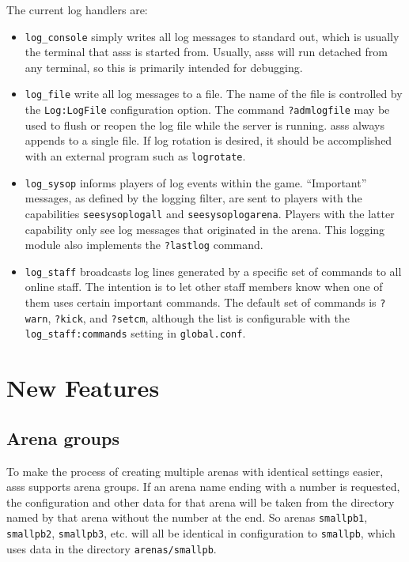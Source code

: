 \documentclass{article}
\newcommand{\asss}{asss}
\begin{document}
The current log handlers are:

\begin{itemize}

\item{\verb/log_console/} simply writes all log messages to standard
out, which is usually the terminal that \asss{} is started from.
Usually, \asss{} will run detached from any terminal, so this is
primarily intended for debugging.

\item{\verb/log_file/} write all log messages to a file. The name of the
file is controlled by the \verb/Log:LogFile/ configuration option. The
command \verb/?admlogfile/ may be used to flush or reopen the log file
while the server is running. \asss{} always appends to a single file. If
log rotation is desired, it should be accomplished with an external
program such as \verb/logrotate/.

\item{\verb/log_sysop/} informs players of log events within the game.
``Important'' messages, as defined by the logging filter, are sent to
players with the capabilities \verb/seesysoplogall/ and
\verb/seesysoplogarena/. Players with the latter capability only see log
messages that originated in the arena. This logging module also
implements the \verb/?lastlog/ command.

\item{\verb/log_staff/} broadcasts log lines generated by a specific set
of commands to all online staff. The intention is to let other staff
members know when one of them uses certain important commands. The
default set of commands is \verb/?warn/, \verb/?kick/, and
\verb/?setcm/, although the list is configurable with the
\verb/log_staff:commands/ setting in \verb/global.conf/.

\end{itemize}


\section{New Features}

\subsection{Arena groups}

To make the process of creating multiple arenas with identical settings
easier, \asss{} supports arena groups. If an arena name ending with a
number is requested, the configuration and other data for that arena
will be taken from the directory named by that arena without the number
at the end. So arenas \verb/smallpb1/, \verb/smallpb2/, \verb/smallpb3/,
etc. will all be identical in configuration to \verb/smallpb/, which
uses data in the directory \verb|arenas/smallpb|.
\end{document}
